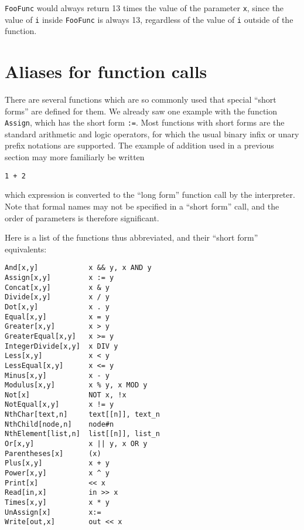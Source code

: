 \noindent \verb+FooFunc+ would always return 13 times the value of the
parameter \verb+x+, since the value of \verb+i+ inside \verb+FooFunc+
is always 13, regardless of the value of \verb+i+ outside of the
function.

\section{Aliases for function calls}

There are several functions which are so commonly used that special
``short forms'' are defined for them.  We already saw one example with
the function \verb+Assign+, which has the short form \verb+:=+.  Most
functions with short forms are the standard arithmetic and logic
operators, for which the usual binary infix or unary prefix notations
are supported.  The example of addition used in a previous section may
more familiarly be written

\begin{verbatim}
1 + 2
\end{verbatim}

\noindent which expression is converted to the ``long form'' function
call by the interpreter.  Note that formal names may not be specified
in a ``short form'' call, and the order of parameters is therefore
significant.

Here is a list of the functions thus abbreviated, and their ``short
form'' equivalents:

\medskip
\begin{multicols}{2}
\begin{verbatim}
And[x,y]            x && y, x AND y 
Assign[x,y]         x := y 
Concat[x,y]         x & y 
Divide[x,y]         x / y
Dot[x,y]            x . y 
Equal[x,y]          x = y 
Greater[x,y]        x > y 
GreaterEqual[x,y]   x >= y
IntegerDivide[x,y]  x DIV y 
Less[x,y]           x < y 
LessEqual[x,y]      x <= y 
Minus[x,y]          x - y 
Modulus[x,y]        x % y, x MOD y 
Not[x]              NOT x, !x 
NotEqual[x,y]       x != y 
NthChar[text,n]     text[[n]], text_n 
NthChild[node,n]    node#n  
NthElement[list,n]  list[[n]], list_n
Or[x,y]             x || y, x OR y 
Parentheses[x]      (x) 
Plus[x,y]           x + y 
Power[x,y]          x ^ y 
Print[x]            << x
Read[in,x]          in >> x 
Times[x,y]          x * y 
UnAssign[x]         x:=
Write[out,x]        out << x 
\end{verbatim}
\end{multicols}

